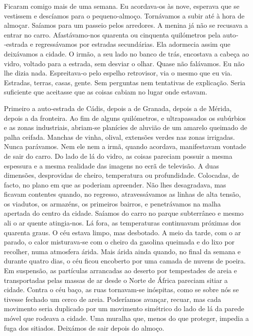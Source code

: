 Ficaram comigo mais de uma semana. Eu acordava­‑os às nove, esperava que
se vestissem e descíamos para o pequeno­‑almoço. Tornávamos a subir até
à hora de almoçar. Saíamos para um passeio pelos arredores. A menina já
não se recusava a entrar no carro. Afastávamo­‑nos quarenta ou cinquenta
quilómetros pela auto­‑estrada e regressávamos por estradas secundárias.
Ela adormecia assim que deixávamos a cidade. O irmão, a seu lado no
banco de trás, encostava a cabeça ao vidro, voltado para a estrada, sem
desviar o olhar. Quase não falávamos. Eu não lhe dizia nada.
Espreitava­‑o pelo espelho retrovisor, via o mesmo que eu via. Estradas,
terras, casas, gente. Sem perguntas nem tentativas de explicação. Seria
suficiente que aceitasse que as coisas cabiam no lugar onde estavam.

Primeiro a auto­‑estrada de Cádis, depois a de Granada, depois a de
Mérida, depois a da fronteira. Ao fim de alguns quilómetros, e
ultrapassados os subúrbios e as zonas industriais, abriam­‑se planícies
de aluvião de um amarelo queimado de palha ceifada. Manchas de vinha,
olival, extensões verdes nas zonas irrigadas. Nunca parávamos. Nem ele
nem a irmã, quando acordava, manifestavam vontade de sair do carro. Do
lado de lá do vidro, as coisas pareciam possuir a mesma espessura e a
mesma realidade das imagens no ecrã de televisão. A duas dimensões,
desprovidas de cheiro, temperatura ou profundidade. Colocadas, de facto,
no plano em que as poderiam apreender. Não lhes desagradava, mas ficavam
contentes quando, no regresso, atravessávamos as linhas de alta tensão,
os viadutos, os armazéns, os primeiros bairros, e penetrávamos na malha
apertada do centro da cidade. Saíamos do carro no parque subterrâneo e
mesmo ali o ar quente atingia­‑nos. Lá fora, as temperaturas continuavam
próximas dos quarenta graus. O céu estava limpo, mas desbotado. A meio
da tarde, com o ar parado, o calor misturava­‑se com o cheiro da
gasolina queimada e do lixo por recolher, numa atmosfera árida. Mais
árida ainda quando, no final da semana e durante quatro dias, o céu
ficou encoberto por uma camada de nuvens de poeira. Em suspensão, as
partículas arrancadas ao deserto por tempestades de areia e
transportadas pelas massas de ar desde o Norte de África pareciam sitiar
a cidade. Contra o céu baço, as ruas tornavam­‑se inóspitas, como se
sobre nós se tivesse fechado um cerco de areia. Poderíamos avançar,
recuar, mas cada movimento seria duplicado por um movimento simétrico do
lado de lá da parede móvel que rodeava a cidade. Uma muralha que, menos
do que proteger, impedia a fuga dos sitiados. Deixámos de sair depois do
almoço.

